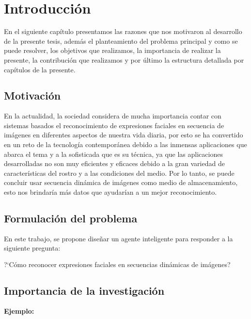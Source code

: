 \chapter{Introducción}
\setcounter{page}{1}
En el siguiente capítulo presentamos las razones que nos motivaron al desarrollo de la presente tesis, además el planteamiento del problema principal y como se puede resolver, los objetivos que realizamos, la importancia de realizar la presente, la contribución que realizamos y por último la estructura detallada por capítulos de la presente.

\vskip 0.3cm  

\section{Motivación}

En la actualidad, la sociedad considera de mucha importancia contar con sistemas basados el reconocimiento de expresiones faciales en secuencia de imágenes en diferentes aspectos de nuestra vida diaria, por esto se ha convertido en un reto de la tecnología contemporánea debido a las inmensas aplicaciones que abarca el tema y a la sofisticada que es su técnica, ya que las aplicaciones desarrolladas no son muy eficientes y eficaces debido a la gran variedad de características del rostro y a las condiciones del medio.
\vskip 0.3cm
Por lo tanto, se puede concluir usar secuencia dinámica de imágenes como medio de almacenamiento, esto nos brindaría más datos que ayudarían a un mejor reconocimiento.


\section{Formulación del problema}

  En este trabajo, se propone diseñar un agente inteligente para responder a la siguiente pregunta:
 \begin{center} 
     ?`Cómo reconocer expresiones faciales en secuencias dinámicas de imágenes?
 \end{center}

\section{Importancia de la investigación} 

{\bf Ejemplo:}\par

